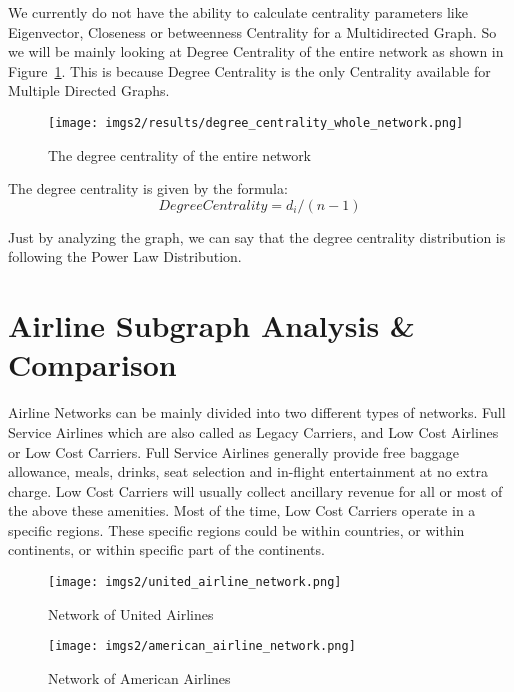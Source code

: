 \documentclass[twocolumn]{tum-article}
\begin{document}
We currently do not have the ability to calculate centrality parameters like Eigenvector, Closeness or betweenness Centrality for a Multidirected Graph. So we will be mainly looking at Degree Centrality of the entire network as shown in Figure~\ref{fig:degree_centrality}.
This is because Degree Centrality is the only Centrality available for Multiple Directed Graphs.

\begin{figure}
        \centering
        \texttt{[image: imgs2/results/degree\_centrality\_whole\_network.png]}
        \caption{
The degree centrality of the entire network}
        \label{fig:degree_centrality}
\end{figure}

The degree centrality is given by the formula:
\begin{equation}
	Degree Centrality=d_i/(n-1)
\end{equation}

Just by analyzing the graph, we can say that the degree centrality distribution is following the Power Law Distribution.

\section{Airline Subgraph Analysis \& Comparison}

Airline Networks can be mainly divided into two different types of networks. Full Service Airlines which are also called as Legacy Carriers, and Low Cost Airlines or Low Cost Carriers.  
Full Service Airlines generally provide free baggage allowance, meals, drinks, seat selection and in-flight entertainment at no extra charge.
Low Cost Carriers will usually collect ancillary revenue for all or most of the above these amenities.
Most of the time, Low Cost Carriers operate in a specific regions.
These specific regions could be within countries, or within continents, or within specific part of the continents.

\begin{figure}
        \centering
        \texttt{[image: imgs2/united\_airline\_network.png]}
        \caption{
Network of United Airlines}
        \label{fig:united_airline}
\end{figure}

\begin{figure}
        \centering
        \texttt{[image: imgs2/american\_airline\_network.png]}
        \caption{
Network of American Airlines}
        \label{fig:american_airline}
\end{figure}
\end{document}
